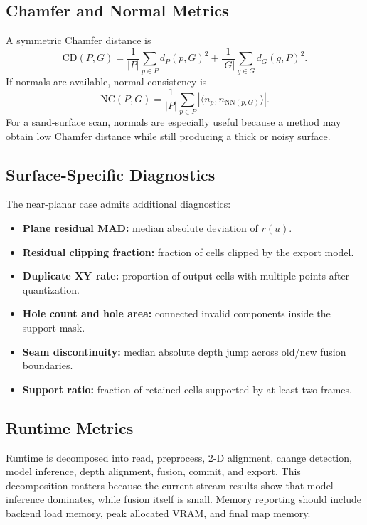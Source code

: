 \documentclass[conference]{IEEEtran}
\begin{document}
\subsection{Chamfer and Normal Metrics}
A symmetric Chamfer distance is
\begin{equation}
\mathrm{CD}(P,G)=
\frac{1}{|P|}\sum_{p\in P}d_P(p,G)^2+
\frac{1}{|G|}\sum_{g\in G}d_G(g,P)^2.
\end{equation}
If normals are available, normal consistency is
\begin{equation}
\mathrm{NC}(P,G)=
\frac{1}{|P|}\sum_{p\in P}
|\langle n_p,n_{\mathrm{NN}(p,G)}\rangle|.
\end{equation}
For a sand-surface scan, normals are especially useful because a method may obtain low Chamfer distance while still producing a thick or noisy surface.

\subsection{Surface-Specific Diagnostics}
The near-planar case admits additional diagnostics:
\begin{itemize}
\item \textbf{Plane residual MAD:} median absolute deviation of $r(u)$.
\item \textbf{Residual clipping fraction:} fraction of cells clipped by the export model.
\item \textbf{Duplicate XY rate:} proportion of output cells with multiple points after quantization.
\item \textbf{Hole count and hole area:} connected invalid components inside the support mask.
\item \textbf{Seam discontinuity:} median absolute depth jump across old/new fusion boundaries.
\item \textbf{Support ratio:} fraction of retained cells supported by at least two frames.
\end{itemize}

\subsection{Runtime Metrics}
Runtime is decomposed into read, preprocess, 2-D alignment, change detection, model inference, depth alignment, fusion, commit, and export. This decomposition matters because the current stream results show that model inference dominates, while fusion itself is small. Memory reporting should include backend load memory, peak allocated VRAM, and final map memory.
\end{document}

